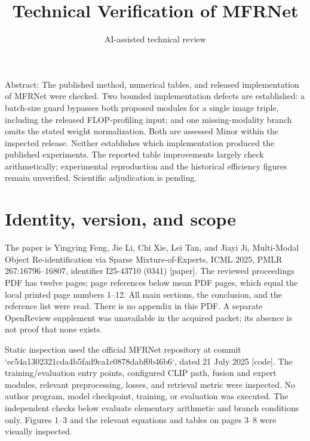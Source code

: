 \documentclass[10pt]{article}
\title{Technical Verification of MFRNet}
\author{AI-assisted technical review}
\date{}
\begin{document}
\maketitle
Abstract: The published method, numerical tables, and released implementation of MFRNet were checked. Two bounded implementation defects are established: a batch-size guard bypasses both proposed modules for a single image triple, including the released FLOP-profiling input; and one missing-modality branch omits the stated weight normalization. Both are assessed Minor within the inspected release. Neither establishes which implementation produced the published experiments. The reported table improvements largely check arithmetically; experimental reproduction and the historical efficiency figures remain unverified. Scientific adjudication is pending.\par
\section*{Identity, version, and scope}
The paper is Yingying Feng, Jie Li, Chi Xie, Lei Tan, and Jiayi Ji, Multi-Modal Object Re-identification via Sparse Mixture-of-Experts, ICML 2025, PMLR 267:16796–16807, identifier I25-43710 (0341) [paper]. The reviewed proceedings PDF has twelve pages; page references below mean PDF pages, which equal the local printed page numbers 1–12. All main sections, the conclusion, and the reference list were read. There is no appendix in this PDF. A separate OpenReview supplement was unavailable in the acquired packet; its absence is not proof that none exists.\par
Static inspection used the official MFRNet repository at commit `ec54a1302321cda4b5fad9ca1c0878dabf0b46b6`, dated 21 July 2025 [code]. The training/evaluation entry points, configured CLIP path, fusion and expert modules, relevant preprocessing, losses, and retrieval metric were inspected. No author program, model checkpoint, training, or evaluation was executed. The independent checks below evaluate elementary arithmetic and branch conditions only. Figures 1–3 and the relevant equations and tables on pages 3–8 were visually inspected.\par
\end{document}
